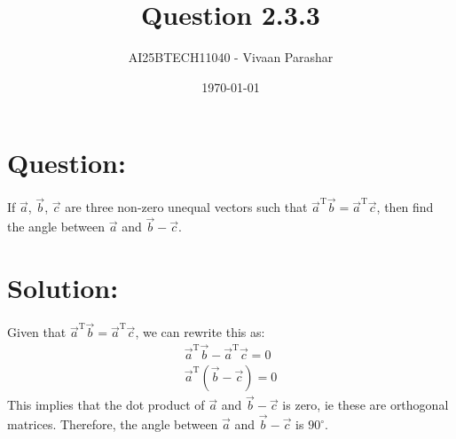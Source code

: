 \documentclass[a4paper, 12pt]{article}
\title{Question 2.3.3}
\author{AI25BTECH11040 - Vivaan Parashar}
\date{\today}
\begin{document}
\maketitle

\section{Question: }
If $\vec{a}$, $\vec{b}$, $\vec{c}$ are three non-zero unequal vectors such that $\vec{a}^{\mathrm{T}}\vec{b} = \vec{a}^{\mathrm{T}}\vec{c}$, then find the angle between $\vec{a}$ and $\vec{b}-\vec{c}$.

\section{Solution: }
Given that $\vec{a}^{\mathrm{T}}\vec{b} = \vec{a}^{\mathrm{T}}\vec{c}$, we can rewrite this as:
\begin{align}
    \vec{a}^{\mathrm{T}}\vec{b} - \vec{a}^{\mathrm{T}}\vec{c} = 0 \\
    \vec{a}^{\mathrm{T}}(\vec{b} - \vec{c}) = 0
\end{align}
This implies that the dot product of $\vec{a}$ and $\vec{b} - \vec{c}$ is zero, ie these are orthogonal matrices.
Therefore, the angle between $\vec{a}$ and $\vec{b} - \vec{c}$ is $90^\circ$.
\end{document}
